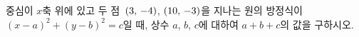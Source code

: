 중심이 $x$축 위에 있고 두 점~$(3,\mkern3mu -4)$, $(10,\mkern3mu -3)$을 지나는 원의 방정식이 $(x-a)^2+(y-b)^2=c$일 때, 상수 $a$, $b$, $c$에 대하여 $a+b+c$의 값을 구하시오.
